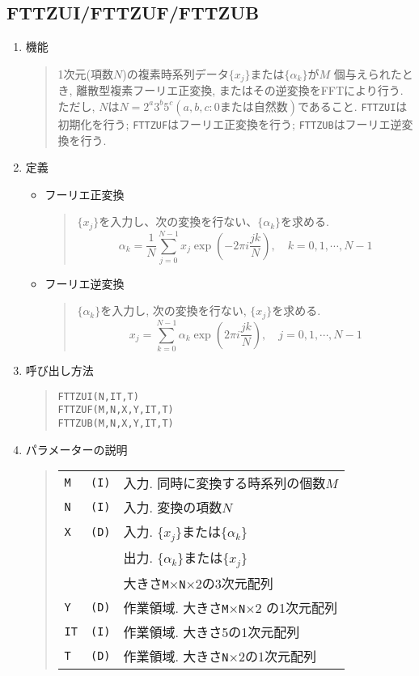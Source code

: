 \documentclass[a4j]{jarticle}
\newcommand{\ttM}{{\tt M}}
\newcommand{\ttN}{{\tt N}}
\begin{document}
\subsection{FTTZUI/FTTZUF/FTTZUB}
\begin{enumerate}
  \item 機能 
  \begin{quote}
    1次元(項数$N$)の複素時系列データ$\{x_j\}$または$\{\alpha_k\}$が$M$
    個与えられたとき, 
    離散型複素フーリエ正変換, またはその逆変換をFFTにより行う. ただし, 
    $N$は$N=2^a3^b5^c(a,b,c: 0または自然数)$であること. 
     {\tt FTTZUI}は初期化を行う;
     {\tt FTTZUF}はフーリエ正変換を行う;
     {\tt FTTZUB}はフーリエ逆変換を行う.

  \end{quote}
  \item 定義
    \begin{itemize}
     \item フーリエ正変換
      \begin{quote}
       $\{x_j\}$を入力し、次の変換を行ない、$\{\alpha_k\}$を求める.
       $$\alpha_k=\frac1N\sum^{N-1}_{j=0}x_j\exp(-2\pi i\frac{jk}N),
       \quad k=0,1,\cdots,N-1$$
      \end{quote}
     \item フーリエ逆変換
      \begin{quote}
       $\{\alpha_k\}$を入力し, 次の変換を行ない, $\{x_j\}$を求める.
       $$x_j=\sum^{N-1}_{k=0}\alpha_k\exp(2\pi i\frac{jk}N),
       \quad j=0,1,\cdots,N-1$$
      \end{quote}
     \end{itemize}    
  \item 呼び出し方法 
  \begin{quote}
    {\tt FTTZUI(N,IT,T)}\\
    {\tt FTTZUF(M,N,X,Y,IT,T)}\\
    {\tt FTTZUB(M,N,X,Y,IT,T)}
  \end{quote}
  \item パラメーターの説明 
  \begin{quote}
    \begin{tabular}{llp{10cm}}
      {\tt M }   & {\tt (I)} & 入力. 同時に変換する時系列の個数$M$\\
      {\tt N }   & {\tt (I)} & 入力. 変換の項数$N$\\
      {\tt X }   & {\tt (D)} & 入力. $\{x_j\}$または$\{\alpha_k\}$\\
                 &           & 出力. $\{\alpha_k\}$または$\{x_j\}$\\
                 &           & 大きさ\ttM$\times$\ttN$\times$2の3次元配列\\
      {\tt Y }   & {\tt (D)} & 作業領域. 大きさ\ttM$\times$\ttN$\times$2
                               の1次元配列\\
      {\tt IT}   & {\tt (I)} & 作業領域. 大きさ5の1次元配列\\
      {\tt T }   & {\tt (D)} & 作業領域. 大きさ\ttN$\times$2の1次元配列
    \end{tabular}
  \end{quote}


\end{enumerate}
\end{document}
